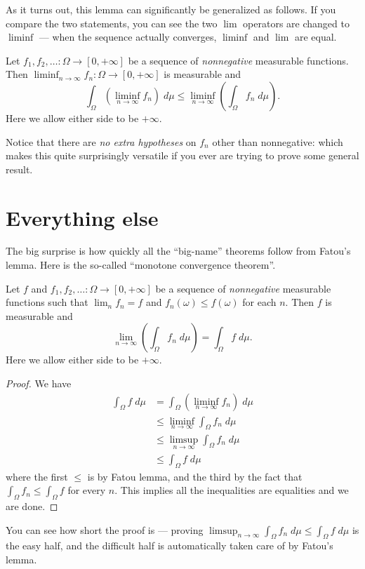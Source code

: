 As it turns out, this lemma can significantly be generalized as follows.
If you compare the two statements, you can see the two $\lim$ operators are changed to $\liminf$ ---
when the sequence actually converges, $\liminf$ and $\lim$ are equal.
\begin{lemma}
	Let $f_1, f_2, \dots \colon \Omega \to [0,+\infty]$
	be a sequence of \emph{nonnegative} measurable functions.
	Then $\liminf_{n \to \infty} f_n \colon \Omega \to [0,+\infty]$ is measurable and
	\[ \int_\Omega \left( \liminf_{n \to \infty} f_n \right) \; d\mu
		\le \liminf_{n \to \infty} \left( \int_\Omega f_n \; d\mu \right).  \]
	Here we allow either side to be $+\infty$.
\end{lemma}
Notice that there are \emph{no extra hypotheses}
on $f_n$ other than nonnegative: which makes this quite surprisingly versatile
if you ever are trying to prove some general result.

\section{Everything else}
The big surprise is how quickly all the ``big-name''
theorems follow from Fatou's lemma.
Here is the so-called ``monotone convergence theorem''.
\begin{corollary}
	Let $f$ and $f_1, f_2, \dots \colon \Omega \to [0,+\infty]$
	be a sequence of \emph{nonnegative}
	measurable functions such that $\lim_n f_n = f$
	and $f_n(\omega) \le f(\omega)$ for each $n$.
	Then $f$ is measurable and
	\[ \lim_{n \to \infty} \left( \int_\Omega f_n \; d\mu \right)
		= \int_\Omega f \; d\mu. \]
	Here we allow either side to be $+\infty$.
\end{corollary}
\begin{proof}
	We have
	\begin{align*}
		\int_\Omega f \; d\mu
		&= \int_\Omega \left( \liminf_{n \to \infty} f_n \right) \; d\mu \\
		&\le \liminf_{n \to \infty} \int_\Omega f_n \; d\mu \\
		&\le \limsup_{n \to \infty} \int_\Omega f_n \; d\mu \\
		&\le \int_\Omega f \; d\mu
	\end{align*}
	where the first $\le$ is by Fatou lemma,
	and the third by the fact that
	$\int_\Omega f_n \le \int_\Omega f$ for every $n$.
	This implies all the inequalities are equalities and we are done.
\end{proof}
You can see how short the proof is ---
proving $\limsup_{n \to \infty} \int_\Omega f_n \; d\mu \le \int_\Omega f \; d\mu$ is the easy half,
and the difficult half is automatically taken care of by Fatou's lemma.

